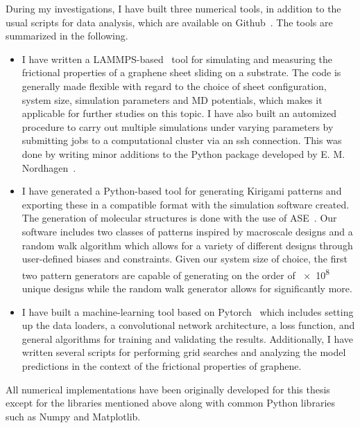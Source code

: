 During my investigations, I have built three numerical tools, in addition to the usual scripts for data analysis, which are available on
Github~\cite{Github}. The tools are summarized in the following. 
\begin{itemize}
    \item I have written a LAMMPS-based~\cite{LAMMPS} tool for simulating and
    measuring the frictional properties of a graphene sheet sliding on a
    substrate. The code is generally made flexible with regard to the choice of
    sheet configuration, system size, simulation parameters and \acrshort{MD}
    potentials, which makes it applicable for further studies on this topic.
    I have also built an automized procedure to carry out multiple simulations
    under varying parameters by submitting jobs to a computational cluster via
    an ssh connection. This was done by writing minor additions to the Python package developed by E. M. Nordhagen~\cite{lammps_simulator}.
    \item I have generated a Python-based tool for generating Kirigami patterns
    and exporting these in a compatible format with the simulation software created. The
    generation of molecular structures is done with the use of
    ASE~\cite{ase-paper}. Our software includes two classes of patterns inspired
    by macroscale designs and a random walk algorithm which allows for a variety
    of different designs through user-defined biases and constraints. Given our
    system size of choice, the first two pattern generators are capable of
    generating on the order of \num{e8} unique designs while the random walk
    generator allows for significantly more. 
    \item I have built a machine-learning tool based on
    Pytorch~\cite{NEURIPS2019_9015} which includes setting up the data loaders,
    a convolutional network architecture, a loss function, and general
    algorithms for training and validating the results. Additionally, I have
    written several scripts for performing grid searches and analyzing the model
    predictions in the context of the frictional properties of graphene. 
\end{itemize}
All numerical implementations have been originally
developed for this thesis except for the libraries mentioned above along with common Python libraries such as Numpy and
Matplotlib.

